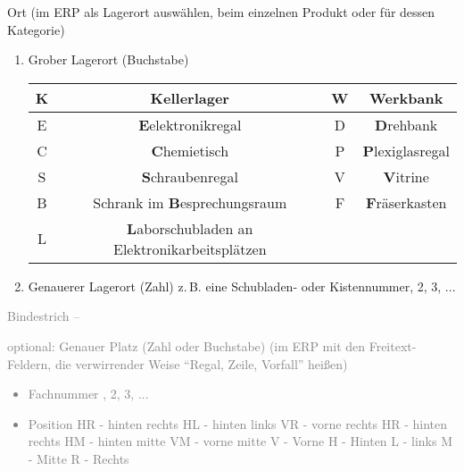 \documentclass{\basedir/fablab-document}
\begin{document}
\begin{enumerate}
\item Ort (im ERP als Lagerort auswählen, beim einzelnen Produkt oder für dessen Kategorie)
\begin{enumerate}
\item Grober Lagerort (Buchstabe)
	
	\begin{tabular}{c|c|c|c}
	\hline 
	K & \textbf{K}ellerlager & W & \textbf{W}erkbank \\ 
	\hline 
	E & \textbf{E}elektronikregal & D & \textbf{D}rehbank \\ 
	\hline 
	C & \textbf{C}hemietisch & P & \textbf{P}lexiglasregal \\ 
	\hline 
	S & \textbf{S}chraubenregal & V & \textbf{V}itrine \\ 
	\hline 
	B & Schrank im \textbf{B}esprechungsraum & F & \textbf{F}räserkasten \\ 
	\hline 
	L & \textbf{L}aborschubladen an Elektronikarbeitsplätzen \\ 
	\hline
	\end{tabular} 
\item Genauerer Lagerort (Zahl) \newline
	z.\,B. eine Schubladen- oder Kistennummer, 2, 3, ...
\end{enumerate}
\textcolor{gray}{
\item    Bindestrich --
\item   optional: Genauer Platz (Zahl oder Buchstabe) (im ERP mit den Freitext-Feldern, die verwirrender Weise \enquote{Regal, Zeile, Vorfall} heißen)
	\begin{itemize}
	\item Fachnummer , 2, 3, ...
	\item Position\newline
    HR - hinten rechts\newline
    HL - hinten links\newline
    VR - vorne rechts\newline
    HR - hinten rechts\newline
    HM - hinten mitte\newline
    VM - vorne mitte\newline
    V - Vorne\newline
    H - Hinten\newline
    L - links\newline
    M - Mitte\newline
    R - Rechts
	\end{itemize}
}
\end{enumerate}
\end{document}
